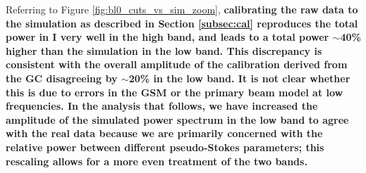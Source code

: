 \documentclass[twocolumn, trackchanges]{aastex61}
\newcommand{\edited}[1]{{\bf \color{blue} #1}}
\begin{document}
Referring to Figure \ref{fig:bl0_cuts_vs_sim_zoom}, \edited{calibrating the raw data to the simulation as described in Section \ref{subsec:cal} reproduces the total power in I very well in the high band, and leads to a total power $\sim$40\% higher than the simulation in the low band. This discrepancy is consistent with the overall amplitude of the calibration derived from the GC disagreeing by $\sim$20\% in the low band. It is not clear whether this is due to errors in the GSM or the primary beam model at low frequencies.
In the analysis that follows, we have increased the amplitude of the simulated power
  spectrum in the low band to agree with the real data because we are primarily
  concerned with the relative power between different pseudo-Stokes parameters;
  this rescaling allows for a more even treatment of the two bands.}



\end{document}
